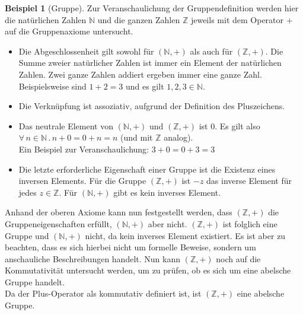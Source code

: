 \documentclass[12pt,a4paper, usenames, dvipsnames]{article}
\theoremstyle{mystyle}
\theoremstyle{definition}
\newtheorem{bsp}{Beispiel}[definition]
\begin{document}
\begin{bsp}[Gruppe]

Zur Veranschaulichung der Gruppendefinition werden hier die natürlichen Zahlen $\mathbb{N}$ und die ganzen Zahlen $\mathbb{Z}$ jeweils mit dem Operator $+$ auf die Gruppenaxiome untersucht.
\begin{itemize}
\item Die Abgeschlossenheit gilt sowohl für $(\mathbb{N},+)$ als auch für $(\mathbb{Z},+)$. Die Summe zweier natürlicher Zahlen ist immer ein Element der natürlichen Zahlen. Zwei ganze Zahlen addiert ergeben immer eine ganze Zahl. \\
Beispielsweise sind $1+2=3$ und es gilt $1,2,3 \in \mathbb{N}$.
\item Die Verknüpfung ist assoziativ, aufgrund der Definition des Pluszeichens.
\item Das neutrale Element von $(\mathbb{N},+)$ und $(\mathbb{Z},+)$ ist $0$. Es gilt also $\forall \, n \in \mathbb{N} \, . \, n + 0 = 0 + n = n$ (und mit $\mathbb{Z}$ analog). \\
Ein Beispiel zur Veranschaulichung: $3+0=0+3=3$
\item Die letzte erforderliche Eigenschaft einer Gruppe ist die Existenz eines inversen Elements. Für die Gruppe $(\mathbb{Z},+)$ ist $-z$ das inverse Element für jedes $z \in \mathbb{Z}$. Für $(\mathbb{N},+)$ gibt es kein inverses Element.
\end{itemize}
Anhand der oberen Axiome kann nun festgestellt werden, dass $(\mathbb{Z},+)$ die Gruppeneigenschaften erfüllt, $(\mathbb{N},+)$ aber nicht. 
$(\mathbb{Z},+)$ ist folglich eine Gruppe und $(\mathbb{N},+)$ nicht, da kein inverses Element existiert. 
Es ist aber zu beachten, dass es sich hierbei nicht um formelle Beweise, sondern um anschauliche Beschreibungen handelt.
Nun kann $(\mathbb{Z},+)$ noch auf die Kommutativität untersucht werden, um zu prüfen, ob es sich um eine abelsche Gruppe handelt. \\
Da der Plus-Operator als kommutativ definiert ist, ist $(\mathbb{Z},+)$ eine abelsche Gruppe.

\end{bsp}
\end{document}
